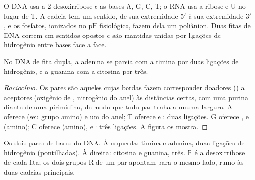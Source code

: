 O DNA usa a 2-desoxirribose e as bases A, G, C, T; o RNA usa a ribose e U no lugar de T. A cadeia tem um
sentido, de sua extremidade 5$'$ à sua extremidade 3$'$, e os fosfatos, ionizados no pH fisiológico, fazem
dela um poliânion. Duas fitas de DNA correm em sentidos opostos e são mantidas unidas por ligações de
hidrogênio entre bases face a face.

\begin{proposition}\label{prop:b2:biomolecules:pairing}
No DNA de fita dupla, a adenina se pareia com a timina por duas ligações de hidrogênio, e a guanina com
a citosina por três.
\end{proposition}

\begin{proof}[Raciocínio]
Os pares são aqueles cujas bordas fazem corresponder doadores () a aceptores (oxigênio de
, nitrogênio do anel) às distâncias certas, com uma purina diante de uma pirimidina, de modo que
todo par tenha a mesma largura. A oferece  (seu grupo amino) e um  do anel; T oferece
 e : duas ligações. G oferece ,  e  (amino); C oferece 
(amino),  e : três ligações. A figura os mostra.
\end{proof}

\begin{omfigure}
%
\hspace{2.3em}%
\hspace{1.5em}
%
\hspace{2.3em}%
\par\vspace{6pt}

{\small Os dois pares de bases do DNA. À esquerda: timina e adenina, duas ligações de hidrogênio
(pontilhadas). À direita: citosina e guanina, três. R é a desoxirribose de cada fita; os dois grupos R
de um par apontam para o mesmo lado, rumo às duas cadeias principais.}
\end{omfigure}

